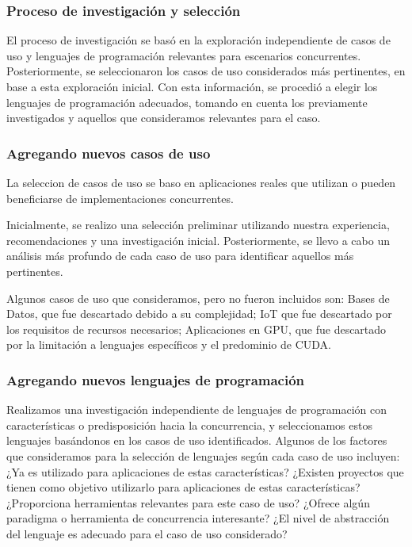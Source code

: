 \documentclass[11pt]{article}
\let\Oldsubsubsection\subsubsection
\renewcommand{\subsubsection}{\FloatBarrier\Oldsubsubsection}
\begin{document}
\subsubsection{Proceso de investigación y selección}

El proceso de investigación se basó en la exploración independiente de casos de uso y lenguajes de programación relevantes para escenarios concurrentes. Posteriormente, se seleccionaron los casos de uso considerados más pertinentes, en base a esta exploración inicial. Con esta información, se procedió a elegir los lenguajes de programación adecuados, tomando en cuenta los previamente investigados y aquellos que consideramos relevantes para el caso.

\subsubsection{Agregando nuevos casos de uso}

La seleccion de casos de uso se baso en aplicaciones reales que utilizan o pueden beneficiarse de implementaciones concurrentes.

Inicialmente, se realizo una selección preliminar utilizando nuestra experiencia, recomendaciones y una investigación inicial. Posteriormente, se llevo a cabo un análisis más profundo de cada caso de uso para identificar aquellos más pertinentes.

Algunos casos de uso que consideramos, pero no fueron incluidos son:
Bases de Datos, que fue descartado debido a su complejidad;
IoT que fue descartado por los requisitos de recursos necesarios;
Aplicaciones en GPU, que fue descartado por la limitación a lenguajes específicos y el predominio de CUDA.

\subsubsection{Agregando nuevos lenguajes de programación}

Realizamos una investigación independiente de lenguajes de programación con características o predisposición hacia la concurrencia, y seleccionamos estos lenguajes basándonos en los casos de uso identificados. Algunos de los factores que consideramos para la selección de lenguajes según cada caso de uso incluyen:
¿Ya es utilizado para aplicaciones de estas características?
¿Existen proyectos que tienen como objetivo utilizarlo para aplicaciones de estas características?
¿Proporciona herramientas relevantes para este caso de uso?
¿Ofrece algún paradigma o herramienta de concurrencia interesante?
¿El nivel de abstracción del lenguaje es adecuado para el caso de uso considerado?
\end{document}
